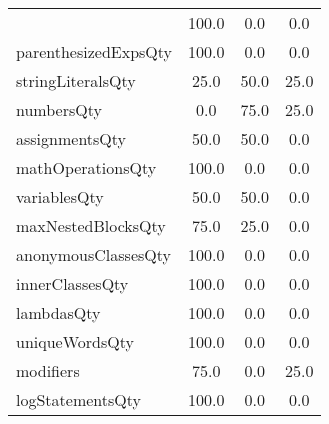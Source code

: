 \begin{tabular}{lccc}
{tryCatchQty & 100.0 & 0.0 & 0.0 \\
parenthesizedExpsQty & 100.0 & 0.0 & 0.0 \\
stringLiteralsQty & 25.0 & 50.0 & 25.0 \\
numbersQty & 0.0 & 75.0 & 25.0 \\
assignmentsQty & 50.0 & 50.0 & 0.0 \\
mathOperationsQty & 100.0 & 0.0 & 0.0 \\
variablesQty & 50.0 & 50.0 & 0.0 \\
maxNestedBlocksQty & 75.0 & 25.0 & 0.0 \\
anonymousClassesQty & 100.0 & 0.0 & 0.0 \\
innerClassesQty & 100.0 & 0.0 & 0.0 \\
lambdasQty & 100.0 & 0.0 & 0.0 \\
uniqueWordsQty & 100.0 & 0.0 & 0.0 \\
modifiers & 75.0 & 0.0 & 25.0 \\
logStatementsQty & 100.0 & 0.0 & 0.0 \\
\bottomrule
              \end{tabular}
            